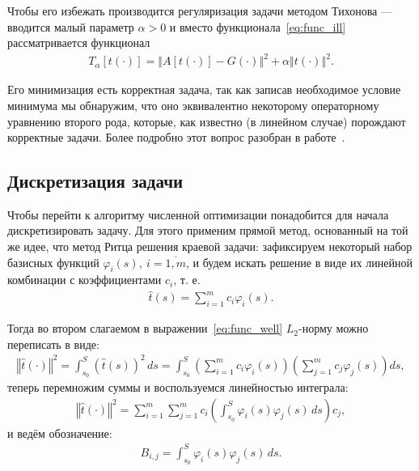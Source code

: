 \documentclass[a4paper,14pt]{extarticle}
\newcommand{\norm}[1]{\left\Vert #1 \right\Vert}
\begin{document}
    Чтобы его избежать производится регуляризация задачи методом Тихонова --- вводится малый параметр $\alpha > 0$ и вместо функционала~\eqref{eq:func_ill} рассматривается функционал
    \begin{gather}
        \label{eq:func_well}
        T_{\alpha}[t(\cdot)] = \norm{A[t(\cdot)] - G(\cdot)}^2
        + \alpha \norm{t(\cdot)}^2.
    \end{gather}

    Его минимизация есть корректная задача, так как записав необходимое условие минимума мы обнаружим, что оно эквивалентно некоторому операторному уравнению второго рода, которые, как известно (в линейном случае) порождают корректные задачи. Более подробно этот вопрос разобран в работе~\cite{bib:Jonca:1988}.

    \subsection{Дискретизация задачи}

    Чтобы перейти к алгоритму численной оптимизации понадобится для начала дискретизировать задачу. Для этого применим прямой метод, основанный на той же идее, что метод Ритца решения краевой задачи: зафиксируем некоторый набор базисных функций $\varphi_i(s), \ i = \overline{1, m}$, и будем искать решение в виде их линейной комбинации с коэффициентами $c_i$, т. е.
    \begin{gather*}
        \hat{t}(s) = \sum_{i = 1}^m c_i \varphi_i(s).
    \end{gather*}

    Тогда во втором слагаемом в выражении~\eqref{eq:func_well} $L_2$-норму можно переписать в виде:
    \begin{gather*}
        \norm{\hat{t}(\cdot)}^2
        = \int_{s_0}^S (\hat{t}(s))^2 \, ds
        = \int_{s_0}^S \left(
        \sum_{i = 1}^m c_i \varphi_i(s)
        \right)
        \left(
        \sum_{j = 1}^m c_{j} \varphi_{j}(s)
        \right)
        ds,
    \end{gather*}
    теперь перемножим суммы и воспользуемся линейностью интеграла:
    \begin{gather*}
        \norm{\hat{t}(\cdot)}^2
        = \sum_{i = 1}^m \sum_{j = 1}^m
        c_i \left(
        \int_{s_0}^S \varphi_i(s) \varphi_{j}(s) \, ds
        \right) c_{j},
    \end{gather*}
    и ведём обозначение:
    \begin{gather*}
        B_{i, j}
        = \int_{s_0}^S \varphi_i(s) \varphi_{j}(s) \, ds.
    \end{gather*}
\end{document}
